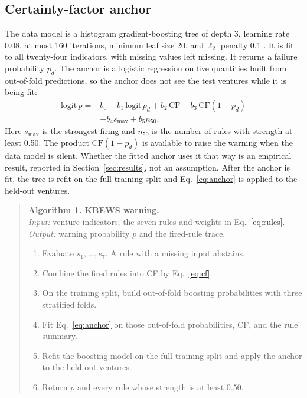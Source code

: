 \documentclass[preprint,12pt]{elsarticle}
\begin{document}
\subsection{Certainty-factor anchor}
The data model is a histogram gradient-boosting tree of depth 3, learning rate 0.08, at most 160 iterations, minimum leaf size 20, and $\ell_2$ penalty 0.1 \cite{friedman2001}. It is fit to all twenty-four indicators, with missing values left missing. It returns a failure probability $p_d$. The anchor is a logistic regression on five quantities built from out-of-fold predictions, so the anchor does not see the test ventures while it is being fit:
\begin{equation}
\begin{aligned}
\mathrm{logit}\,p ={}& b_0 + b_1\,\mathrm{logit}\,p_d + b_2\,\mathrm{CF} + b_3\,\mathrm{CF}(1-p_d) \\
& + b_4 s_{\max} + b_5 n_{50}.
\end{aligned}
\label{eq:anchor}
\end{equation}
Here $s_{\max}$ is the strongest firing and $n_{50}$ is the number of rules with strength at least 0.50. The product $\mathrm{CF}(1-p_d)$ is available to raise the warning when the data model is silent. Whether the fitted anchor uses it that way is an empirical result, reported in Section~\ref{sec:results}, not an assumption. After the anchor is fit, the tree is refit on the full training split and Eq.~\eqref{eq:anchor} is applied to the held-out ventures.

\begin{quote}
\noindent\textbf{Algorithm 1. KBEWS warning.}\\
\textit{Input:} venture indicators; the seven rules and weights in Eq.~\eqref{eq:rules}.\\
\textit{Output:} warning probability $p$ and the fired-rule trace.
\begin{enumerate}
\item Evaluate $s_1,\ldots,s_7$. A rule with a missing input abstains.
\item Combine the fired rules into CF by Eq.~\eqref{eq:cf}.
\item On the training split, build out-of-fold boosting probabilities with three stratified folds.
\item Fit Eq.~\eqref{eq:anchor} on those out-of-fold probabilities, CF, and the rule summary.
\item Refit the boosting model on the full training split and apply the anchor to the held-out ventures.
\item Return $p$ and every rule whose strength is at least 0.50.
\end{enumerate}
\end{quote}
\end{document}
